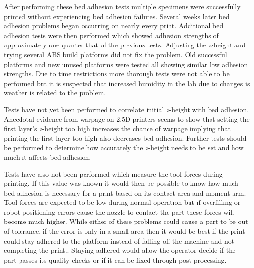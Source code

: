 \documentclass[main.tex]{subfiles}
\begin{document}
After performing these bed adhesion tests multiple specimens were successfully printed without experiencing bed adhesion failures.
Several weeks later bed adhesion problems began occurring on nearly every print.
Additional bed adhesion tests were then performed which showed adhesion strengths of approximately one quarter that of the previous tests.
Adjusting the $z$\nobreakdash-height and trying several ABS build platforms did not fix the problem.
Old successful platforms and new unused platforms were tested all showing similar low adhesion strengths.
Due to time restrictions more thorough tests were not able to be performed but it is suspected that increased humidity in the lab due to changes is weather is related to the problem.

Tests have not yet been performed to correlate initial $z$\nobreakdash-height with bed adhesion.
Anecdotal evidence from warpage on 2.5D printers seems to show that setting the first layer's $z$\nobreakdash-height too high increases the chance of warpage implying that printing the first layer too high also decreases bed adhesion.
Further tests should be performed to determine how accurately the $z$\nobreakdash-height needs to be set and how much it affects bed adhesion.

Tests have also not been performed which measure the tool forces during printing.
If this value was known it would then be possible to know how much bed adhesion is necessary for a print based on its contact area and moment arm.
Tool forces are expected to be low during normal operation but if overfilling or robot positioning errors cause the nozzle to contact the part these forces will become much higher.
While either of these problems could cause a part to be out of tolerance, if the error is only in a small area then it would be best if the print could stay adhered to the platform instead of falling off the machine and not completing the print..
Staying adhered would allow the operator decide if the part passes its quality checks or if it can be fixed through post processing.
\end{document}
